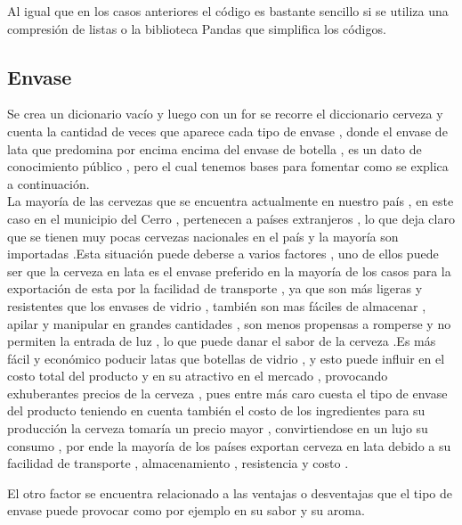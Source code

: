 \documentclass[twocolumn,12pt]{article}
\begin{document}
Al igual que en los casos anteriores el código es bastante sencillo si se utiliza una compresión de listas o la biblioteca Pandas que simplifica los códigos.


\subsection{Envase}

Se crea un dicionario vacío y luego con un for se recorre el diccionario cerveza y cuenta la cantidad de veces que aparece cada tipo de envase , donde el envase de lata que predomina por encima encima del envase de botella , es un dato de conocimiento público , pero el cual tenemos bases para fomentar como se explica a continuación.\\

La mayoría de las cervezas que se encuentra actualmente en nuestro país , en este caso en el municipio del Cerro , pertenecen a países extranjeros , lo que deja claro que se tienen  muy pocas cervezas nacionales en el país  y  la mayoría son importadas .Esta situación puede deberse a varios factores , uno de ellos puede ser que la cerveza en lata es el envase preferido en la mayoría de  los casos para la exportación de esta por la facilidad de transporte , ya que son más ligeras y resistentes que los envases de vidrio  , también son mas fáciles de almacenar , apilar y manipular en grandes cantidades , son menos propensas a romperse  y no permiten la entrada de luz , lo que puede danar el sabor de la cerveza .Es más fácil y económico poducir latas que botellas de vidrio , y esto puede influir en el costo total  del producto  y en su atractivo en el mercado , provocando exhuberantes precios de la cerveza , pues entre más caro cuesta el tipo de envase del producto teniendo en cuenta también el costo de los ingredientes para su producción la cerveza tomaría un precio mayor , convirtiendose en un lujo su consumo , por ende la mayoría de los países exportan cerveza en lata debido a su facilidad de transporte , almacenamiento , resistencia y costo .

El otro factor se encuentra relacionado a las ventajas o desventajas que el tipo de envase puede provocar como por ejemplo en su sabor y su aroma.\\
\end{document}
